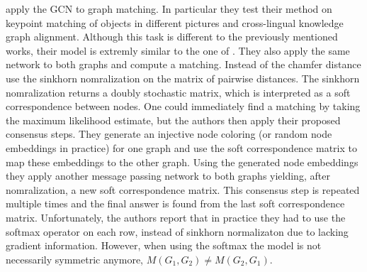 \cite{fey2020_update} apply the GCN to graph matching. %
In particular they test their method on keypoint matching of objects in different pictures and cross-lingual knowledge graph alignment. Although this task is different to the previously mentioned works, their model is extremly similar to the one of \cite{riba2018}. They also apply the same network to both graphs and compute a matching. Instead of the chamfer distance \cite{fey2020_update} use the sinkhorn nomralization \cite{sinkhorn2013} on the matrix of pairwise distances. The sinkhorn nomralization returns a doubly stochastic matrix, which is interpreted as a soft correspondence between nodes. One could immediately find a matching by taking the maximum likelihood estimate, but the authors then apply their proposed consensus steps. They generate an injective node coloring (or random node embeddings in practice) for one graph and use the soft correspondence matrix to map these embeddings to the other graph. Using the generated node embeddings they apply another message passing network to both graphs yielding, after nomralization, a new soft correspondence matrix. This consensus step is repeated multiple times and the final answer is found from the last soft correspondence matrix. Unfortunately, the authors report that in practice they had to use the softmax operator on each row, instead of sinkhorn normalizaton due to lacking gradient information. However, when using the softmax the model is not necessarily symmetric anymore, $M(G_1, G_2) \neq M(G_2, G_1)$.







